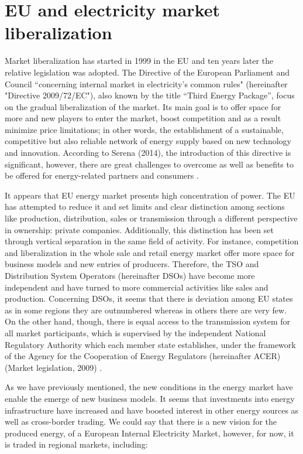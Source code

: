 \section{EU and electricity market liberalization}
Market liberalization has started in 1999 in the EU and ten years later the relative legislation was adopted. The Directive of the European Parliament and Council “concerning internal market in electricity's common rules" (hereinafter "Directive 2009/72/EC"), also known by the title “Third Energy Package”, focus on the gradual liberalization of the market. Its main goal is to offer space for more and new players to enter the market, boost competition and as a result minimize price limitations; in other words, the establishment of a sustainable, competitive but also reliable network of energy supply based on new technology and innovation. According to Serena (2014), the introduction of this directive is significant, however, there are great challenges to overcome as well as benefits to be offered for energy-related partners and consumers \cite{manuel2017europes}.
\par It appears that EU energy market presents high concentration of power. The EU has attempted to reduce it and set limits and clear distinction among sections like production, distribution, sales or transmission through a different perspective in ownership: private companies. Additionally, this distinction has been set through vertical separation in the same field of activity. For instance, competition and liberalization in the whole sale and retail energy market offer more space for business models and new entries of producers. Therefore, the TSO and Distribution System Operators (hereinafter DSOs) have become more independent and have turned to more commercial activities like sales and production. Concerning DSOs, it seems that there is deviation among EU states as in some regions they are outnumbered whereas in others there are very few. On the other hand, though, there is equal access to the transmission system for all market participants, which is supervised by the independent National Regulatory Authority which each member state establishes, under the framework of the Agency for the Cooperation of Energy Regulators (hereinafter ACER) (Market legislation, 2009) \cite{scholz2014application,union2009directive}.
\par As we have previously mentioned, the new conditions in the energy market have enable the emerge of new business models. It seems that investments into energy infrastructure have increased and have boosted interest in other energy sources as well as cross-border trading. We could say that there is a new vision for the produced energy, of a European Internal Electricity Market, however, for now, it is traded in regional markets, including:
